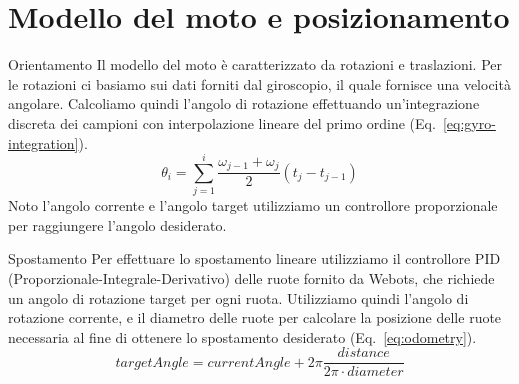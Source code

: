 \documentclass[10pt]{beamer}
\begin{document}
	\section{Modello del moto e posizionamento}\label{sec:Modello-del-moto-e-posizionamento} 
	\frame{\sectionpage}
	
	\begin{frame}{Orientamento}
		Il modello del moto è caratterizzato da rotazioni e traslazioni. Per le
		rotazioni ci basiamo sui dati forniti dal giroscopio, il quale fornisce
		una velocità angolare. Calcoliamo quindi l'angolo di rotazione
		effettuando un'integrazione discreta dei campioni con interpolazione
		lineare del primo ordine (Eq.~\ref{eq:gyro-integration}).  
		\begin{equation}\label{eq:gyro-integration}
			\theta_i = \sum_{j=1}^i \frac{\omega _{j-1}+\omega _j}{2} \left( t_j-t_{j-1} \right) 
		\end{equation}
		Noto l'angolo corrente e l'angolo target utilizziamo un controllore
		proporzionale per raggiungere l'angolo desiderato.
	\end{frame}
	
	\begin{frame}{Spostamento}
		Per effettuare lo spostamento lineare utilizziamo il controllore PID
		(Proporzionale-Integrale-Derivativo) delle ruote fornito da Webots, che
		richiede un angolo di rotazione target per ogni ruota. Utilizziamo quindi
		l'angolo di rotazione corrente, e il diametro delle ruote per calcolare la
		posizione delle ruote necessaria al fine di ottenere lo spostamento
		desiderato (Eq.~\ref{eq:odometry}).
		\begin{equation}\label{eq:odometry}
		targetAngle =
		currentAngle+2\pi\frac    {distance}
						{2\pi \cdot diameter}
		\end{equation}
	\end{frame}
	
\end{document}
